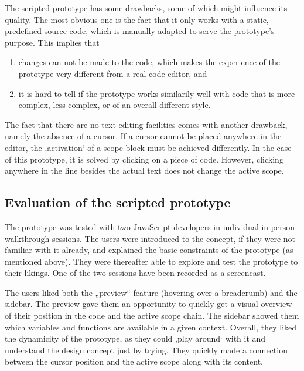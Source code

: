 The scripted prototype has some drawbacks, some of which might influence
its quality. The most obvious one is the fact that it only works with a
static, predefined source code, which is manually adapted to serve the
prototype’s purpose. This implies that

\begin{enumerate}
\def\labelenumi{\arabic{enumi}.}
\itemsep1pt\parskip0pt
\item
  changes can not be made to the code, which makes the experience of the
  prototype very different from a real code editor, and
\item
  it is hard to tell if the prototype works similarily well with code
  that is more complex, less complex, or of an overall different style.
\end{enumerate}

The fact that there are no text editing facilities comes with another
drawback, namely the absence of a cursor. If a cursor cannot be placed
anywhere in the editor, the ‚activation‘ of a scope block must be
achieved differently. In the case of this prototype, it is solved by
clicking on a piece of code. However, clicking anywhere in the line
besides the actual text does not change the active scope.

\subsection{Evaluation of the scripted
prototype}\label{evaluation-of-the-scripted-prototype}

The prototype was tested with two JavaScript developers in individual
in-person walkthrough sessions. The users were introduced to the
concept, if they were not familiar with it already, and explained the
basic constraints of the prototype (as mentioned above). They were
thereafter able to explore and test the prototype to their likings. One
of the two sessions have been recorded as a screencast.

The users liked both the „preview“ feature (hovering over a breadcrumb)
and the sidebar. The preview gave them an opportunity to quickly get a
visual overview of their position in the code and the active scope
chain. The sidebar showed them which variables and functions are
available in a given context. Overall, they liked the dynamicity of the
prototype, as they could ‚play around‘ with it and understand the design
concept just by trying. They quickly made a connection between the
cursor position and the active scope along with its content.

